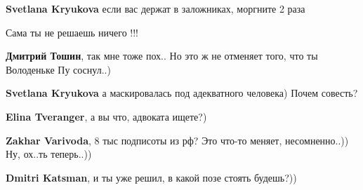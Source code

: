 \begin{itemize}
\begin{itemize}
\textbf{Svetlana Kryukova} если вас держат в заложниках, моргните 2 раза

 
Сама ты не решаешь ничего !!!

 
\textbf{Дмитрий Тошин}, так мне тоже пох.. Но это ж не отменяет того, что ты Володеньке Пу соснул..)

 
\textbf{Svetlana Kryukova} а маскировалась под адекватного человека) Почем совесть?

 
\textbf{Elina Tveranger}, а вы что, адвоката ищете?)

 
\textbf{Zakhar Varivoda}, 8 тыс подписоты из рф? Это что-то меняет, несомненно..)) Ну, ох..ть теперь..))

 
\textbf{Dmitri Katsman}, и ты уже решил, в какой позе стоять будешь?))

 

\end{itemize}
\end{itemize}
